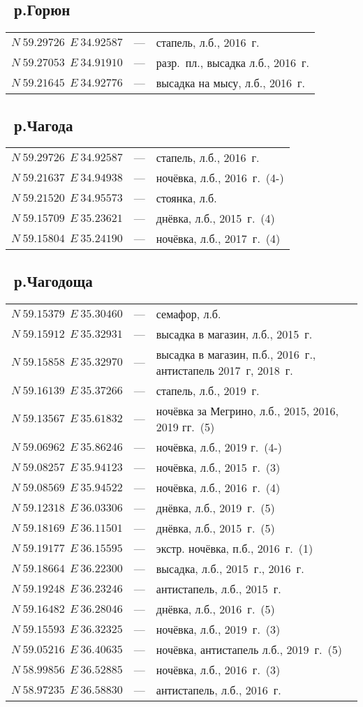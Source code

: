 \subsection*{~р.Горюн}
\begin{longtable}[c]{>{\raggedright}m{40mm} >{\raggedleft}m{7mm}>{\raggedright}p{65mm} }		
${N~59.29726~~E~34.92587}$ & --- & стапель, л.б., 2016~г.\tabularnewline
${N~59.27053~~E~34.91910}$ & --- & разр.~пл., высадка л.б., 2016~г.\tabularnewline
${N~59.21645~~E~34.92776}$ & --- & высадка на мысу, л.б., 2016~г.\tabularnewline
\end{longtable}

\subsection*{~р.Чагода}
\begin{longtable}[c]{>{\raggedright}m{40mm} >{\raggedleft}m{7mm}>{\raggedright}p{65mm} }		
${N~59.29726~~E~34.92587}$ & --- & стапель, л.б., 2016~г.\tabularnewline
${N~59.21637~~E~34.94938}$ & --- & ночёвка, л.б., 2016~г.~(4-)\tabularnewline
${N~59.21520~~E~34.95573}$ & --- & стоянка, л.б.\tabularnewline
${N~59.15709~~E~35.23621}$ & --- & днёвка, л.б., 2015~г.~(4)\tabularnewline
${N~59.15804~~E~35.24190}$ & --- & ночёвка, л.б., 2017~г.~(4)\tabularnewline
\end{longtable}

\newpage 
\subsection*{~р.Чагодоща}
\begin{longtable}[c]{>{\raggedright}m{40mm} >{\raggedleft}m{7mm}>{\raggedright}p{65mm} }		
${N~59.15379~~E~35.30460}$ & --- & семафор, л.б. \tabularnewline
${N~59.15912~~E~35.32931}$ & --- & высадка в магазин, л.б., 2015~г.\tabularnewline
${N~59.15858~~E~35.32970}$ & --- & высадка в магазин, п.б., 2016~г., антистапель 2017~г, 2018~г.\tabularnewline
${N~59.16139~~E~35.37266}$ & --- & стапель, л.б., 2019~г.\tabularnewline
${N~59.13567~~E~35.61832}$ & --- & ночёвка за Мегрино, л.б., 2015, 2016, 2019 гг.~(5)\tabularnewline
${N~59.06962~~E~35.86246}$ & --- & ночёвка, л.б., 2019 г.~(4-)\tabularnewline
${N~59.08257~~E~35.94123}$ & --- & ночёвка, л.б., 2015~г.~(3)\tabularnewline
${N~59.08569~~E~35.94522}$ & --- & ночёвка, л.б., 2016~г.~(4)\tabularnewline
${N~59.12318~~E~36.03306}$ & --- & днёвка, л.б., 2019~г.~(5)\tabularnewline
${N~59.18169~~E~36.11501}$ & --- & днёвка, л.б., 2015~г.~(5)\tabularnewline
${N~59.19177~~E~36.15595}$ & --- & экстр. ночёвка, п.б., 2016~г.~(1)\tabularnewline
${N~59.18664~~E~36.22300}$ & --- & высадка, л.б., 2015~г., 2016~г.\tabularnewline
${N~59.19248~~E~36.23246}$ & --- & антистапель, л.б., 2015~г.\tabularnewline
${N~59.16482~~E~36.28046}$ & --- & днёвка, л.б., 2016~г.~(5)\tabularnewline
${N~59.15593~~E~36.32325}$ & --- & ночёвка, л.б., 2019~г.~(3)\tabularnewline
${N~59.05216~~E~36.40635}$ & --- & ночёвка, антистапель л.б., 2019~г.~(5)\tabularnewline
${N~58.99856~~E~36.52885}$ & --- & ночёвка, л.б., 2016~г.~(3)\tabularnewline
${N~58.97235~~E~36.58830}$ & --- & антистапель, л.б., 2016~г.\tabularnewline
\end{longtable}

